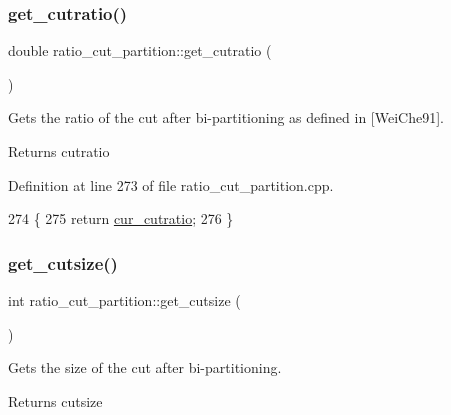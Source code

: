 \mbox{\label{classratio__cut__partition_a9a61b2be36953d57e36fbb511cf1aa96}} 
\subsubsection{\texorpdfstring{get\+\_\+cutratio()}{get\_cutratio()}}
{\footnotesize\ttfamily double ratio\+\_\+cut\+\_\+partition\+::get\+\_\+cutratio (\begin{DoxyParamCaption}{ }\end{DoxyParamCaption})}

Gets the ratio of the cut after bi-\/partitioning as defined in \mbox{[}Wei\+Che91\mbox{]}.

\begin{DoxyReturn}{Returns}
cutratio 
\end{DoxyReturn}


Definition at line 273 of file ratio\+\_\+cut\+\_\+partition.\+cpp.


\begin{DoxyCode}
274 \{
275     \textcolor{keywordflow}{return} \mbox{\hyperlink{classratio__cut__partition_a9dad324884cef5bcdd50122fc98e0860}{cur\_cutratio}};
276 \}
\end{DoxyCode}
\mbox{\label{classratio__cut__partition_a4fc9beab107546850974ffd5a47c1e7f}} 
\subsubsection{\texorpdfstring{get\+\_\+cutsize()}{get\_cutsize()}}
{\footnotesize\ttfamily int ratio\+\_\+cut\+\_\+partition\+::get\+\_\+cutsize (\begin{DoxyParamCaption}{ }\end{DoxyParamCaption})}

Gets the size of the cut after bi-\/partitioning.

\begin{DoxyReturn}{Returns}
cutsize 
\end{DoxyReturn}


